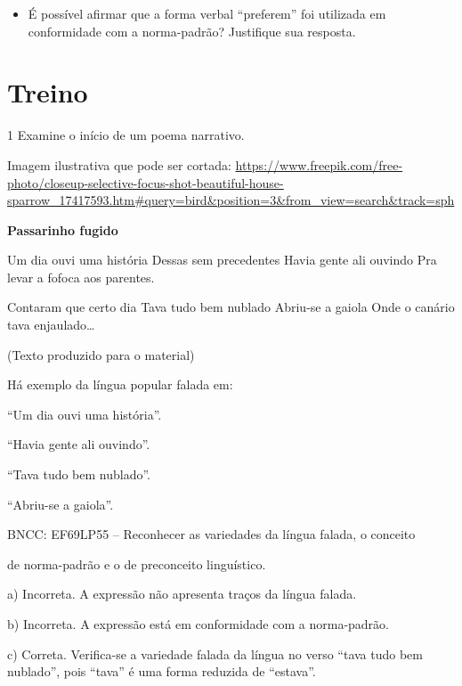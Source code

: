 \begin{itemize}
\tightlist
\item
  É possível afirmar que a forma verbal ``preferem'' foi utilizada em
  conformidade com a norma-padrão? Justifique sua resposta. 
\end{itemize}

\section{Treino}

\num{1} Examine o início de um poema narrativo.

Imagem ilustrativa que pode ser cortada:
\url{https://www.freepik.com/free-photo/closeup-selective-focus-shot-beautiful-house-sparrow_17417593.htm\#query=bird\&position=3\&from_view=search\&track=sph}

\textbf{Passarinho fugido}

Um dia ouvi uma história Dessas sem precedentes Havia gente ali ouvindo
Pra levar a fofoca aos parentes.

Contaram que certo dia Tava tudo bem nublado Abriu-se a gaiola Onde o
canário tava enjaulado\ldots{}

(Texto produzido para o material)

Há exemplo da língua popular falada em:

\begin{escolha}
\item ``Um dia ouvi uma história''.

\item ``Havia gente ali ouvindo''.

\item ``Tava tudo bem nublado''.

\item ``Abriu-se a gaiola''.

\end{escolha}BNCC: EF69LP55 -- Reconhecer as variedades da língua falada, o conceito

de norma-padrão e o de preconceito linguístico.

a) Incorreta. A expressão não apresenta traços da língua falada.

b) Incorreta. A expressão está em conformidade com a norma-padrão.

c) Correta. Verifica-se a variedade falada da língua no verso ``tava
tudo bem nublado'', pois ``tava'' é uma forma reduzida de ``estava''.

